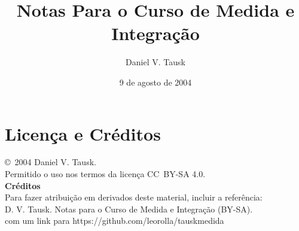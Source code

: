 \documentclass[oneside,final,11pt]{amsbook}
\title{Notas Para o Curso de Medida e Integração}
\author{Daniel V. Tausk}
\date{9 de agosto de 2004}
\theoremstyle{remark}\newtheorem{exercise}{Exercício}[chapter]
\theoremstyle{remark}\newtheorem{*exercise}[exercise]{\hbox to 0pt{\hskip 0pt minus 1fil*}Exercício}
\theoremstyle{definition}\newtheorem{exdefin}{Definição}[chapter]
\theoremstyle{plain}\newtheorem{teo}{Teorema}[section]
\theoremstyle{plain}\newtheorem{lem}[teo]{Lema}
\theoremstyle{plain}\newtheorem{prop}[teo]{Proposição}
\theoremstyle{plain}\newtheorem{cor}[teo]{Corolário}
\theoremstyle{definition}\newtheorem{defin}[teo]{Definição}
\theoremstyle{remark}\newtheorem{rem}[teo]{Observação}
\theoremstyle{definition}\newtheorem{notation}[teo]{Notação}
\theoremstyle{definition}\newtheorem{convention}[teo]{Convenção}
\theoremstyle{definition}\newtheorem{example}[teo]{Exemplo}
\numberwithin{section}{chapter}
\numberwithin{equation}{section}
\begin{document}
\frontmatter
\maketitle

\chapter*{Licença e Créditos}

\noindent
\copyright\ 2004 Daniel V. Tausk.
\\
Permitido o uso nos termos da licença CC~BY-SA 4.0.
\\

\noindent
\textbf{Créditos}
\\
Para fazer atribuição em derivados deste material, incluir a referência:
\\
D. V. Tausk. Notas para o Curso de Medida e Integração (BY-SA).
\\
com um link para
https://github.com/leorolla/tauskmedida

\renewcommand{\contentsline}[3]{\csname novo#1\endcsname{#2}{#3}}
\newcommand{\novochapter}[2]{\bigskip\hbox to \hsize{\vbox{\advance\hsize by -1cm\baselineskip=12pt\parfillskip=0pt\leftskip=3cm\noindent\hskip -2cm #1\leaders\hbox{.}\hfil\hfil\par}$\,$#2\hfil}}
\newcommand{\novosection}[2]{\medskip\hbox to \hsize{\vbox{\advance\hsize by -1cm\baselineskip=12pt\parfillskip=0pt\leftskip=3.5cm\noindent\hskip -2cm #1\leaders\hbox{.}\hfil\hfil\par}$\,$#2\hfil}}
\newcommand{\novosubsection}[2]{\baselineskip=12pt}%

\iflatexml
\else
\tableofcontents
\fi

\mainmatter
\end{document}

